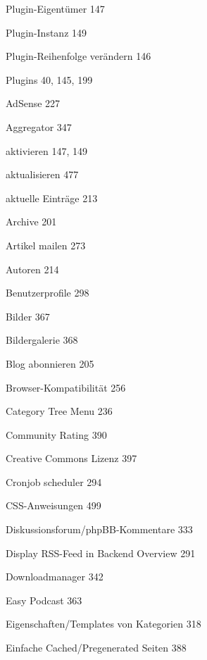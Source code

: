 \documentclass{book}
\renewcommand\subitem{\par}
\begin{document}
\begin{multicols}{2}
\begin{osp-index}
  \item Plugin-Eigent\"umer\hspace{1mm} 147
  \item Plugin-Instanz\hspace{1mm} 149
  \item Plugin-Reihenfolge ver\"andern\hspace{1mm} 146
  \item Plugins\hspace{1mm} 40, 145, 199
    \subitem AdSense\hspace{1mm} 227
    \subitem Aggregator\hspace{1mm} 347
    \subitem aktivieren\hspace{1mm} 147, 149
    \subitem aktualisieren\hspace{1mm} 477
    \subitem aktuelle Eintr\"age\hspace{1mm} 213
    \subitem Archive\hspace{1mm} 201
    \subitem Artikel mailen\hspace{1mm} 273
    \subitem Autoren\hspace{1mm} 214
    \subitem Benutzerprofile\hspace{1mm} 298
    \subitem Bilder\hspace{1mm} 367
    \subitem Bildergalerie\hspace{1mm} 368
    \subitem Blog abonnieren\hspace{1mm} 205
    \subitem Browser-Kompatibilit\"at\hspace{1mm} 256
    \subitem Category Tree Menu\hspace{1mm} 236
    \subitem Community Rating\hspace{1mm} 390
    \subitem Creative Commons Lizenz\hspace{1mm} 397
    \subitem Cronjob scheduler\hspace{1mm} 294
    \subitem CSS-Anweisungen\hspace{1mm} 499
    \subitem Diskussionsforum/phpBB-Kommentare\hspace{1mm} 333
    \subitem Display RSS-Feed in Backend Overview\hspace{1mm} 291
    \subitem Downloadmanager\hspace{1mm} 342
    \subitem Easy Podcast\hspace{1mm} 363
    \subitem Eigenschaften/Templates von Kategorien\hspace{1mm} 318
    \subitem Einfache Cached/Pregenerated Seiten\hspace{1mm} 388

\end{osp-index}
\end{multicols}
\end{document}
